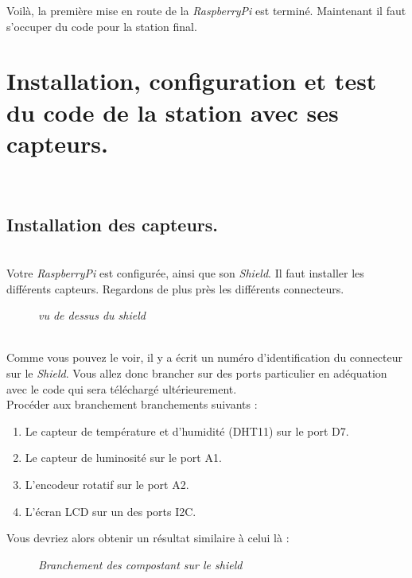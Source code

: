 Voilà, la première mise en route de la \textit{RaspberryPi} est terminé. Maintenant il faut s'occuper du code pour la station final.

\newpage
\section{Installation, configuration et test du code de la station avec ses capteurs.}\\

\subsection{Installation des capteurs.}\\

Votre \textit{RaspberryPi} est configurée, ainsi que son \textit{Shield}. Il faut installer les différents capteurs. Regardons de plus près les différents connecteurs.\\

	\begin{figure}[H]
	\begin{center}
	\end{center}
		\caption{ \textit{vu de dessus du shield}}
	\end{figure}\\
	
Comme vous pouvez le voir, il y a écrit un numéro d'identification du connecteur sur le \textit{Shield}. Vous allez donc brancher sur des ports particulier en adéquation avec le code qui sera téléchargé ultérieurement.\\

Procéder aux branchement branchements suivants :
\begin{enumerate}
	\item Le capteur de température et d'humidité (DHT11) sur le port D7.
	\item Le capteur de luminosité sur le port A1.
	\item L'encodeur rotatif sur le port A2.
	\item L'écran LCD sur un des ports I2C.
\end{enumerate}
Vous devriez alors obtenir un résultat similaire à celui là :
	\begin{figure}[H]
	\begin{center}
	\end{center}
		\caption{ \textit{Branchement des compostant sur le shield}}
	\end{figure}\\

